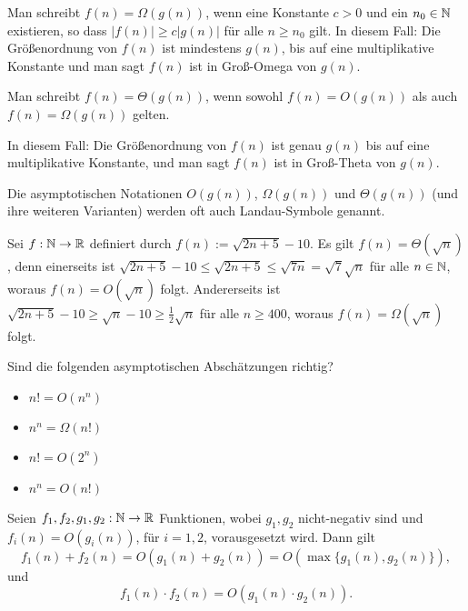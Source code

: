\begin{defn} 
Man schreibt $f(n) = \Omega(g(n))$, wenn eine Konstante $c>0$ und ein $n_0 \in \mathbb{N}$ existieren, so dass $|f(n)| \ge c |g(n)|$ für alle $n \ge n_0$ gilt. In diesem Fall: Die Größenordnung von $f(n)$ ist mindestens $g(n)$, bis auf eine multiplikative Konstante und man sagt \glqq$f(n)$ ist in Groß-Omega von $g(n)$\grqq. 
\end{defn} 

\begin{defn} 
Man schreibt $f(n) = \Theta(g(n))$, wenn sowohl $f(n) = O(g(n))$ als auch$f(n) = \Omega(g(n))$ gelten.
\end{defn} 

\begin{bem}
In diesem Fall: Die Größenordnung von $f(n)$ ist genau $g(n)$ bis auf eine multiplikative Konstante, und man sagt \glqq$f(n)$ ist in Groß-Theta von $g(n)$\grqq.
\end{bem} 

\begin{bem}
Die asymptotischen Notationen $O(g(n))$, $\Omega(g(n))$ und $\Theta(g(n))$ (und ihre weiteren Varianten) werden oft auch Landau-Symbole genannt.
\end{bem} 

\begin{bsp}
	Sei $f : \mathbb{N} \to \mathbb{R}$ definiert durch $f(n):=\sqrt{2 n + 5 } - 10$. Es gilt $f(n) = \Theta(\sqrt{n})$, denn einerseits ist $\sqrt{2n + 5} - 10 \le \sqrt{2n + 5} \le \sqrt{ 7n} = \sqrt{7} \sqrt{n}$ für alle $n \in \mathbb{N}$, woraus $f(n) = O(\sqrt{n})$ folgt. Andererseits ist $\sqrt{2n + 5} - 10 \ge \sqrt{n} - 10 \ge \frac{1}{2} \sqrt{n}$ für alle $n \ge 400$, woraus $f(n) = \Omega(\sqrt{n})$ folgt.  
\end{bsp}

\begin{aufg}
	Sind die folgenden asymptotischen Abschätzungen richtig?
	\begin{itemize}
		\item $n! = O(n^n)$
		\item $n^n = \Omega(n!)$
		\item $n! = O(2^n)$
		\item $n^n = O(n!)$
	\end{itemize}
\end{aufg}


\begin{bem}
	Seien $f_1,f_2,g_1,g_2 : \mathbb{N} \to \mathbb{R}$ Funktionen, wobei $g_1,g_2$ nicht-negativ sind und $f_i(n) = O(g_i(n))$, für $i=1,2$, vorausgesetzt wird. Dann gilt
	\[
	f_1(n) + f_2(n) = O(g_1(n)+g_2(n)) = O(\max\{g_1(n),g_2(n)\}),
	\]
	und
	\[
	f_1(n) \cdot f_2(n) = O(g_1(n)\cdot g_2(n)).
	\]
\end{bem}

